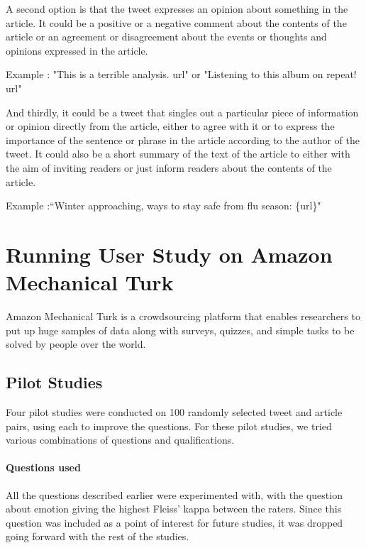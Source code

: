 A second option is that the tweet expresses an opinion about something in the article. It could be a positive or a negative comment about the contents of the article or an agreement or disagreement about the events or thoughts and opinions expressed in the article. 

Example : "This is a terrible analysis. {url}" or "Listening to this album on repeat! {url}"

And thirdly, it could be a tweet that singles out a particular piece of information or opinion directly from the article, either to agree with it or to express the importance of the sentence or phrase in the article according to the author of the tweet. It could also be a short summary of the text of the article to either with the aim of inviting readers or just inform readers about the contents of the article.

Example :``Winter approaching, ways to stay safe from flu season: \{url\}"


\section{Running User Study on Amazon Mechanical Turk}

Amazon Mechanical Turk is a crowdsourcing platform that enables researchers to put up huge samples of data along with surveys, quizzes, and simple tasks to be solved by people over the world.

\subsection{Pilot Studies}

 Four pilot studies were conducted on 100 randomly selected tweet and article pairs, using each to improve the questions. For these pilot studies, we tried various combinations of questions and qualifications.
 
 \paragraph{Questions used} All the questions described earlier were experimented with, with the question about emotion giving the highest Fleiss' kappa \citep{geertzen2012inter} between the raters. Since this question was included as a point of interest for future studies, it was dropped going forward with the rest of the studies.
 
